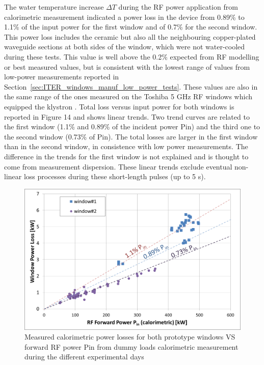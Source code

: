 {The water temperature increase $\Delta T$ during the RF power application from calorimetric measurement indicated a power loss in the device from 0.89\% to 1.1\% of the input power for the first window and of 0.7\% for the second window. This power loss includes the ceramic but also all the neighbouring copper-plated waveguide sections at both sides of the window, which were not water-cooled during these tests. This value is well above the 0.2\% expected from RF modelling or best measured values, but is consistent with the lowest range of values from low-power measurements reported in Section~\ref{sec:ITER_windows_manuf_low_power_tests}. These values are also in the same range of the ones measured on the Toshiba 5 GHz RF windows which equipped the klystron . Total loss versus input power for both windows is reported in Figure 14 and shows linear trends. Two trend curves are related to the first window (1.1\% and 0.89\% of the incident power Pin) and the third one to the second window (0.73\% of Pin). The total losses are larger in the first window than in the second window, in consistence with low power measurements. The difference in the trends for the first window is not explained and is thought to come from measurement dispersion. These linear trends exclude eventual non-linear loss processes during these short-length pulses (up to 5 s). 

\begin{figure}
	\centering
	\includegraphics[width=1.0\linewidth]{figures/chap3/ITER_window/ITER_windows_power_loss}
	\caption{Measured calorimetric power losses for both prototype windows VS forward RF power Pin from dummy loads calorimetric measurement during the different experimental days}
	\label{fig:iterwindowspowerloss}
\end{figure}

}
